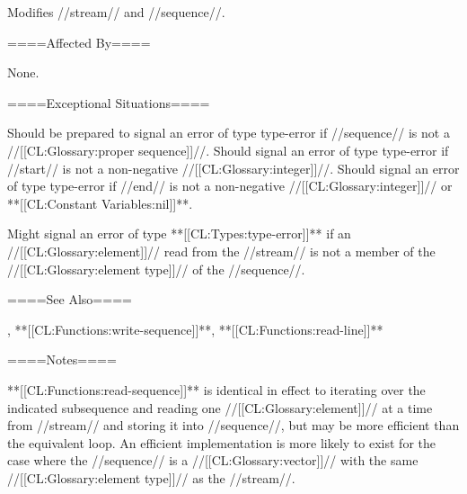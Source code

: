 Modifies //stream// and //sequence//.

====Affected By====

None.

====Exceptional Situations====

Should be prepared to signal an error of type type-error if //sequence// is not a //[[CL:Glossary:proper sequence]]//. Should signal an error of type type-error if //start// is not a non-negative //[[CL:Glossary:integer]]//. Should signal an error of type type-error if //end// is not a non-negative //[[CL:Glossary:integer]]// or **[[CL:Constant Variables:nil]]**.

Might signal an error of type **[[CL:Types:type-error]]** if an //[[CL:Glossary:element]]// read from the //stream// is not a member of the //[[CL:Glossary:element type]]// of the //sequence//.

====See Also====

{\secref\ConstantModification}, **[[CL:Functions:write-sequence]]**, **[[CL:Functions:read-line]]**

====Notes====

**[[CL:Functions:read-sequence]]** is identical in effect to iterating over the indicated subsequence and reading one //[[CL:Glossary:element]]// at a time from //stream// and storing it into //sequence//, but may be more efficient than the equivalent loop. An efficient implementation is more likely to exist for the case where the //sequence// is a //[[CL:Glossary:vector]]// with the same //[[CL:Glossary:element type]]// as the //stream//.

